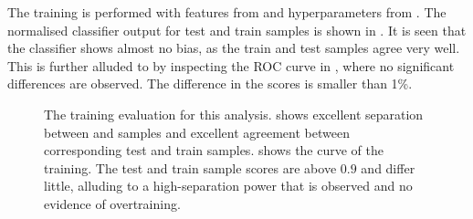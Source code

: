 The training is performed with features from  and hyperparameters from .
The normalised classifier output for test and train samples is shown in .
It is seen that the classifier shows almost no bias, as the train and test samples agree very well.
This is further alluded to by inspecting the ROC curve in , where no significant differences are observed.
The difference in the \AUC scores is smaller than 1\%.
\begin{figure}[htbp!]
    \centering
    \caption{\label{fig:training_evaluation} The training evaluation for this analysis.
     shows excellent separation between \epem\ra\qqbar and \BtoXsgamma samples and excellent agreement between corresponding test and train samples.
     shows the \ROC curve of the training. 
    The test and train sample \AUC scores are above $0.9$ and differ little, alluding to a high-separation power that is observed and no evidence of overtraining.
    }
\end{figure}

